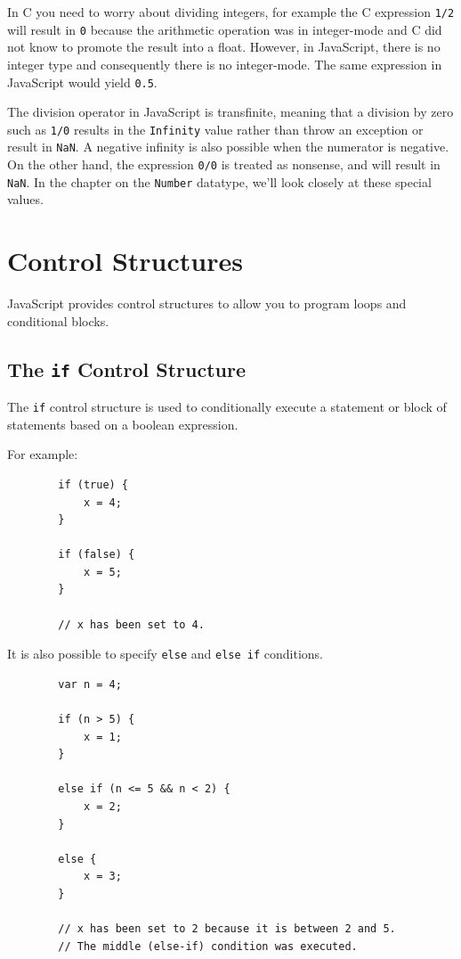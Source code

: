 \documentclass[11pt,letter]{book}
\begin{document}
    In C you need to worry about dividing integers, for example the C expression \texttt{1/2} will 
    result in \texttt{0} because the arithmetic operation was in integer-mode and C did not know to
    promote the result into a float. However, in JavaScript, there is no integer type and 
    consequently there is no integer-mode. The same expression in JavaScript would yield 
    \texttt{0.5}.
    
    The division operator in JavaScript is transfinite, meaning that a division by zero such as
    \texttt{1/0} results in the \texttt{Infinity} value rather than throw an exception or result in 
    \texttt{NaN}. A negative infinity is also possible when the numerator is negative. On the other 
    hand, the expression \texttt{0/0} is treated as nonsense, and will result in \texttt{NaN}. In 
    the chapter on the \texttt{Number} datatype, we'll look closely at these special values.
    
    \section{Control Structures}
    JavaScript provides control structures to allow you to program loops and conditional blocks.
	
    \subsection{The \texttt{if} Control Structure}
    The \texttt{if} control structure is used to conditionally execute a statement or block of 
	statements based on a boolean expression.
	
	For example:
	
	\begin{verbatim}
		if (true) {
			x = 4;
		}
		
		if (false) {
			x = 5;
		}
		
		// x has been set to 4.
	\end{verbatim}
    
	It is also possible to specify \texttt{else} and \texttt{else if} conditions.
	
	\begin{verbatim}
		var n = 4;
		
		if (n > 5) {
			x = 1;
		}
		
		else if (n <= 5 && n < 2) {
			x = 2;
		}
		
		else {
			x = 3;
		}
		
		// x has been set to 2 because it is between 2 and 5.
		// The middle (else-if) condition was executed.
	\end{verbatim}
	
\end{document}
